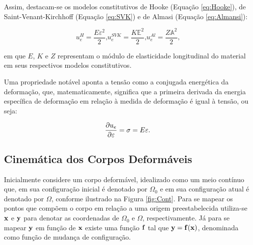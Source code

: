 Assim, destacam-se os modelos constitutivos de Hooke (Equação \ref{eq:Hooke}), de Saint-Venant-Kirchhoff (Equação \ref{eq:SVK}) e de Almasi (Equação \ref{eq:Almansi}):

\begin{subequations}
    \begin{equation}
        u_e^H=\frac{E\varepsilon^2}{2}\text{,}\label{eq:Hooke}
    \end{equation}
    \begin{equation}
        u_e^{SVK}=\frac{K\mathbb{E}^2}{2}\text{,}\label{eq:SVK}
    \end{equation}
    \begin{equation}
        u_e^{Al}=\frac{Z\mathbb{A}^2}{2}\text{,}\label{eq:Almansi}
    \end{equation}
\end{subequations}

\noindent em que $E$, $K$ e $Z$ representam o módulo de elasticidade longitudinal do material em seus respectivos modelos constitutivos.

Uma propriedade notável aponta a tensão como a conjugada energética da deformação, que, matematicamente, significa que a primeira derivada da energia específica de deformação em relação à medida de deformação é igual à tensão, ou seja:

\begin{equation}
    \frac{\partial{u_e}}{\partial{\varepsilon}}=\sigma=E\varepsilon\text{.}
\end{equation}

\subsection{Cinemática dos Corpos Deformáveis} \label{CCD}

Inicialmente considere um corpo deformável, idealizado como um meio contínuo que, em sua configuração inicial é denotado por $\Omega_0$ e em sua configuração atual é denotado por $\Omega$, conforme ilustrado na Figura \ref{fig:Cont}. Para se mapear os pontos que compõem o corpo em relação a uma origem preestabelecida utiliza-se $\mathbf{x}$ e $\mathbf{y}$ para denotar as coordenadas de $\Omega_0$ e $\Omega$, respectivamente. Já para se mapear $\mathbf{y}$ em função de $\mathbf{x}$ existe uma função $\mathbf{f}$ tal que $\mathbf{y}=\mathbf{f}(\mathbf{x})$, denominada como função de mudança de configuração.

